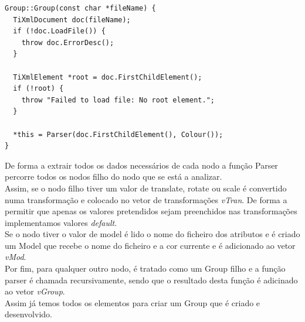 \documentclass[a4paper]{report}
\begin{document}
\begin{lstlisting}
Group::Group(const char *fileName) {
  TiXmlDocument doc(fileName);
  if (!doc.LoadFile()) {
    throw doc.ErrorDesc();
  }

  TiXmlElement *root = doc.FirstChildElement();
  if (!root) {
    throw "Failed to load file: No root element.";
  }

  *this = Parser(doc.FirstChildElement(), Colour());
}
\end{lstlisting}
De forma a extrair todos os dados necessários de cada nodo a função Parser
percorre todos os nodos filho do nodo que se está a analizar.\\
Assim, se o nodo filho tiver um valor de translate, rotate ou scale é convertido
numa transformação e colocado no vetor de transformações \textit{vTran}. De
forma a permitir que apenas os valores pretendidos sejam preenchidos nas
transformações implementamos valores \textit{default}.\\
Se o nodo tiver o valor de model é lido o nome do ficheiro dos atributos e é
criado um Model que recebe o nome do ficheiro e a cor currente e é adicionado ao
vetor \textit{vMod}.\\
Por fim, para qualquer outro nodo, é tratado como um Group filho e a função
parser é chamada recursivamente, sendo que o resultado desta função é adicinado
ao vetor \textit{vGroup}.\\
Assim já temos todos os elementos para criar um Group que é criado e
desenvolvido.
\end{document}
